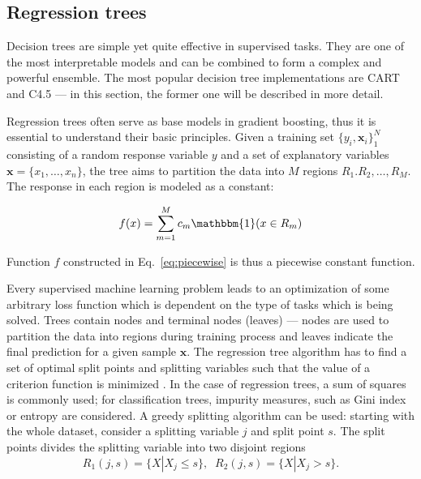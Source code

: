 \documentclass[magisterska, english]{pwr_wmat_praca_dyplomowa}
\theoremstyle{plain}
\numberwithin{theorem}{chapter}
\theoremstyle{definition}
\numberwithin{theorem}{chapter}
\begin{document}
\subsection{Regression trees}
Decision trees are simple yet quite effective in supervised tasks. They are one of the most interpretable models and can be combined to form a complex and powerful ensemble. The most popular decision tree implementations are CART and C4.5 \cite{esl} --- in this section, the former one will be described in more detail.

Regression trees often serve as base models in gradient boosting, thus it is essential to understand their basic principles. Given a training set $\{y_i,\mathbf{x}_i\}_1^N$ consisting of a random response variable $y$ and a set of explanatory variables $\mathbf{x} = \{x_1,\ldots,x_n\}$, the tree aims to partition the data into $M$ regions $R_1. R_2,\ldots, R_M$. The response in each region is modeled as a constant:

\begin{equation}\label{eq:piecewise}
    f(x) = \sum_{m=1}^M c_m \mathbbm{1}(x\in R_m)
\end{equation}

Function $f$ constructed in Eq.~\eqref{eq:piecewise} is thus a piecewise constant function. 

Every supervised machine learning problem leads to an optimization of some arbitrary loss function which is dependent on the type of tasks which is being solved. Trees contain nodes and terminal nodes (leaves) --- nodes are used to partition the data into regions during training process and leaves indicate the final prediction for a given sample $\mathbf{x}$.
The regression tree algorithm has to find a set of optimal split points and splitting variables such that the value of a criterion function is minimized \cite{esl}. In the case of regression trees, a sum of squares is commonly used; for classification trees, impurity measures, such as Gini index or entropy are considered. A greedy splitting algorithm can be used: starting with the whole dataset, consider a splitting variable $j$ and split point $s$. The split points divides the splitting variable into two disjoint regions \cite{esl}
\begin{equation}
    R_1(j,s) = \{X|X_j\le s\}, \;\; R_2(j,s) = \{X|X_j> s\}.
\end{equation}
\end{document}
